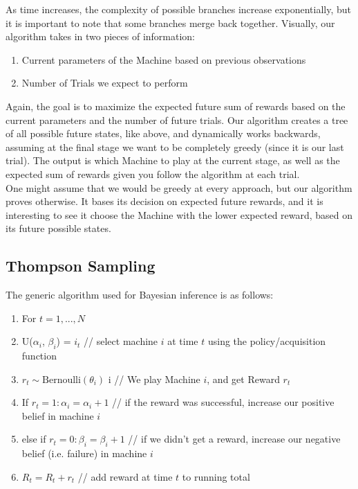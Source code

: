 \documentclass{article}
\begin{document}
As time increases, the complexity of possible branches increase exponentially, but it is important to note that some branches merge back together. Visually, our algorithm takes in two pieces of information:

\begin{enumerate}
\item Current parameters of the Machine based on previous observations\\
\item Number of Trials we expect to perform\\
\end{enumerate}

Again, the goal is to maximize the expected future sum of rewards based on the current parameters and the number of future trials. Our algorithm creates a tree of all possible future states, like above, and dynamically works backwards, assuming at the final stage we want to be completely greedy (since it is our last trial). The output is which Machine to play at the current stage, as well as the expected sum of rewards given you follow the algorithm at each trial.\\

One might assume that we would be greedy at every approach, but our algorithm proves otherwise. It bases its decision on expected future rewards, and it is interesting to see it choose the Machine with the lower expected reward, based on its future possible states.
\subsection{Thompson Sampling}

The generic algorithm used for Bayesian inference is as follows:

\begin{enumerate}
\item For $t = 1, ..., N$
\item U($\alpha_i$, $\beta_i$) = $i_t$  // select machine $i$ at time $t$ using the policy/acquisition function
\item $r_t \sim \text{Bernoulli}(\theta_{i})$  i  // We play Machine $i$, and get Reward $r_t$
\item If $r_t = 1: \alpha_i = \alpha_i + 1$   // if the reward was successful, increase our positive belief in machine $i$
\item else if $r_t = 0: \beta_i = \beta_i + 1$  // if we didn't get a reward, increase our negative belief (i.e. failure) in machine $i$
\item $R_t = R_t + r_t$		// add reward at time $t$ to running total
\end{enumerate}
\end{document}

